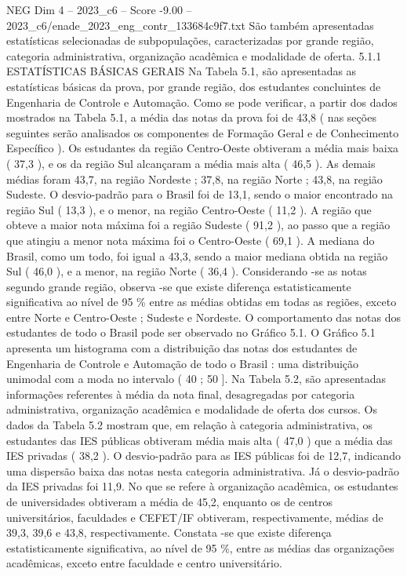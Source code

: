 \begin{textsample}{NEG Dim 4 – 2023\_c6 – Score -9.00 – 2023\_c6/enade\_2023\_eng\_contr\_133684c9f7.txt}
São também apresentadas estatísticas selecionadas de subpopulações, caracterizadas por grande região, categoria administrativa, organização acadêmica e modalidade de oferta. 5.1.1 ESTATÍSTICAS BÁSICAS GERAIS Na Tabela 5.1, são apresentadas as estatísticas básicas da prova, por grande região, dos estudantes concluintes de Engenharia de Controle e Automação.
Como se pode verificar, a partir dos dados mostrados na Tabela 5.1, a média das notas da prova foi de 43,8 ( nas seções seguintes serão analisados os componentes de Formação Geral e de Conhecimento Específico ).
Os estudantes da região Centro-Oeste obtiveram a média mais baixa ( 37,3 ), e os da região Sul alcançaram a média mais alta ( 46,5 ).
As demais médias foram 43,7, na região Nordeste ; 37,8, na região Norte ; 43,8, na região Sudeste.
O desvio-padrão para o Brasil foi de 13,1, sendo o maior encontrado na região Sul ( 13,3 ), e o menor, na região Centro-Oeste ( 11,2 ).
A região que obteve a maior nota máxima foi a região Sudeste ( 91,2 ), ao passo que a região que atingiu a menor nota máxima foi o Centro-Oeste ( 69,1 ).
A mediana do Brasil, como um todo, foi igual a 43,3, sendo a maior mediana obtida na região Sul ( 46,0 ), e a menor, na região Norte ( 36,4 ).
Considerando -se as notas segundo grande região, observa -se que existe diferença estatisticamente significativa ao nível de 95 \% entre as médias obtidas em todas as regiões, exceto entre Norte e Centro-Oeste ; Sudeste e Nordeste.
O comportamento das notas dos estudantes de todo o Brasil pode ser observado no Gráfico 5.1.
O Gráfico 5.1 apresenta um histograma com a distribuição das notas dos estudantes de Engenharia de Controle e Automação de todo o Brasil : uma distribuição unimodal com a moda no intervalo ( 40 ; 50 ].
Na Tabela 5.2, são apresentadas informações referentes à média da nota final, desagregadas por categoria administrativa, organização acadêmica e modalidade de oferta dos cursos.
Os dados da Tabela 5.2 mostram que, em relação à categoria administrativa, os estudantes das IES públicas obtiveram média mais alta ( 47,0 ) que a média das IES privadas ( 38,2 ).
O desvio-padrão para as IES públicas foi de 12,7, indicando uma dispersão baixa das notas nesta categoria administrativa.
Já o desvio-padrão da IES privadas foi 11,9.
No que se refere à organização acadêmica, os estudantes de universidades obtiveram a média de 45,2, enquanto os de centros universitários, faculdades e CEFET/IF obtiveram, respectivamente, médias de 39,3, 39,6 e 43,8, respectivamente.
Constata -se que existe diferença estatisticamente significativa, ao nível de 95 \%, entre as médias das organizações acadêmicas, exceto entre faculdade e centro universitário.

\end{textsample}
